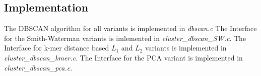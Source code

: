 \subsection{Implementation}

The DBSCAN algorithm for all variants is implemented in \emph{dbscan.c}
The Interface for the Smith-Waterman variants is imlemented in
\emph{cluster\_dbscan\_SW.c}.
The Interface for k-mer distance based $L_1$ and $L_2$ variants is
implemented in \emph{cluster\_dbscan\_kmer.c}.
The Interface for the PCA variant is implemented in
\emph{cluster\_dbscan\_pca.c}.









    
